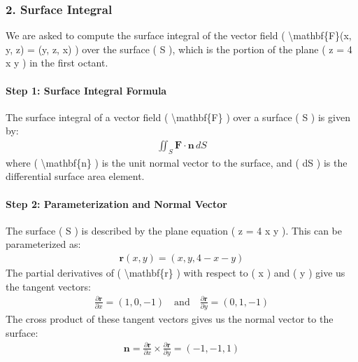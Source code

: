 \documentclass[letterpaper,10pt,english]{jupyterBook}
\begin{document}
\subsubsection{2. Surface Integral}
\label{\detokenize{prerequisites:surface-integral}}
\sphinxAtStartPar
We are asked to compute the surface integral of the vector field ( \textbackslash{}mathbf\{F\}(x, y, z) = (y, z, x) ) over the surface ( S ), which is the portion of the plane ( z = 4 \sphinxhyphen{} x \sphinxhyphen{} y ) in the first octant.


\paragraph{Step 1: Surface Integral Formula}
\label{\detokenize{prerequisites:step-1-surface-integral-formula}}
\sphinxAtStartPar
The surface integral of a vector field ( \textbackslash{}mathbf\{F\} ) over a surface ( S ) is given by:
\begin{equation*}
\begin{split}
\iint_S \mathbf{F} \cdot \mathbf{n} \, dS
\end{split}
\end{equation*}
\sphinxAtStartPar
where ( \textbackslash{}mathbf\{n\} ) is the unit normal vector to the surface, and ( dS ) is the differential surface area element.


\paragraph{Step 2: Parameterization and Normal Vector}
\label{\detokenize{prerequisites:step-2-parameterization-and-normal-vector}}
\sphinxAtStartPar
The surface ( S ) is described by the plane equation ( z = 4 \sphinxhyphen{} x \sphinxhyphen{} y ). This can be parameterized as:
\begin{equation*}
\begin{split}
\mathbf{r}(x, y) = (x, y, 4 - x - y)
\end{split}
\end{equation*}
\sphinxAtStartPar
The partial derivatives of ( \textbackslash{}mathbf\{r\} ) with respect to ( x ) and ( y ) give us the tangent vectors:
\begin{equation*}
\begin{split}
\frac{\partial \mathbf{r}}{\partial x} = (1, 0, -1) \quad \text{and} \quad \frac{\partial \mathbf{r}}{\partial y} = (0, 1, -1)
\end{split}
\end{equation*}
\sphinxAtStartPar
The cross product of these tangent vectors gives us the normal vector to the surface:
\begin{equation*}
\begin{split}
\mathbf{n} = \frac{\partial \mathbf{r}}{\partial x} \times \frac{\partial \mathbf{r}}{\partial y} = (-1, -1, 1)
\end{split}
\end{equation*}
\end{document}

